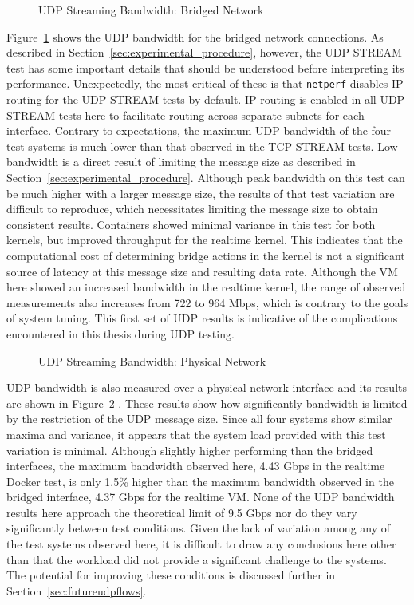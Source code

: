 \begin{figure}
    \centering
    \def\svgwidth{\columnwidth}
    
    \caption{UDP Streaming Bandwidth: Bridged Network}
    \label{fig:udp_stream_bridge}
\end{figure}
Figure~\ref{fig:udp_stream_bridge} shows the UDP bandwidth for the bridged network connections.  
As described in Section~\ref{sec:experimental_procedure}, however, the UDP STREAM test has some important details that should be understood before interpreting its performance.
Unexpectedly, the most critical of these is that \texttt{netperf} disables IP routing for the UDP STREAM tests by default.
IP routing is enabled in all UDP STREAM tests here to facilitate routing across separate subnets for each interface.
Contrary to expectations, the maximum UDP bandwidth of the four test systems is much lower than that observed in the TCP STREAM tests.
Low bandwidth is a direct result of limiting the message size as described in Section~\ref{sec:experimental_procedure}.
Although peak bandwidth on this test can be much higher with a larger message size, the results of that test variation are difficult to reproduce, which necessitates limiting the message size to obtain consistent results.  
Containers showed minimal variance in this test for both kernels, but improved throughput for the realtime kernel.  
This indicates that the computational cost of determining bridge actions in the kernel is not a significant source of latency at this message size and resulting data rate.
Although the VM here showed an increased bandwidth in the realtime kernel, the range of observed measurements also increases from 722 to 964 Mbps, which is contrary to the goals of system tuning. 
This first set of UDP results is indicative of the complications encountered in this thesis during UDP testing.

\begin{figure}
    \centering
    \def\svgwidth{\columnwidth}
    
    \caption{UDP Streaming Bandwidth: Physical Network}
    \label{fig:udp_stream_phys}
\end{figure}

UDP bandwidth is also measured over a physical network interface and its results are shown in Figure~\ref{fig:udp_stream_phys} .  
These results show how significantly bandwidth is limited by the restriction of the UDP message size.
Since all four systems show similar maxima and variance, it appears that the system load provided with this test variation is minimal.
Although slightly higher performing than the bridged interfaces, the maximum bandwidth observed here, 4.43 Gbps in the realtime Docker test, is only 1.5\% higher than the maximum bandwidth observed in the bridged interface, 4.37 Gbps for the realtime VM. 
None of the UDP bandwidth results here approach the theoretical limit of 9.5 Gbps nor do they vary significantly between test conditions.
Given the lack of variation among any of the test systems observed here, it is difficult to draw any conclusions here other than that the workload did not provide a significant challenge to the systems.
The potential for improving these conditions is discussed further in Section~\ref{sec:futureudpflows}.

